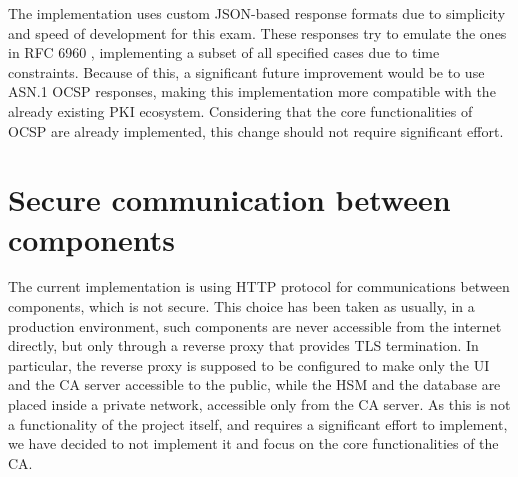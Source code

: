 The implementation uses custom JSON-based response formats due to simplicity and speed of development 
for this exam. These responses try to emulate the ones in RFC 6960 \cite{rfc6960}, implementing a subset of all
specified cases due to time constraints.
Because of this, a significant future improvement would be to use ASN.1 OCSP responses, making this 
implementation more compatible with the already existing PKI ecosystem. Considering that the core 
functionalities of OCSP are already implemented, this change should not require significant effort.

\section{Secure communication between components}
The current implementation is using HTTP protocol for communications between components, which is not 
secure. This choice has been taken as usually, in a production environment, such components are 
never accessible from the internet directly, but only through a reverse proxy that
provides TLS termination. In particular, the reverse proxy is supposed to be configured to make
only the UI and the CA server accessible to the public, while the HSM and the database are 
placed inside a private network, accessible only from the CA server. As this is not a functionality
of the project itself, and requires a significant effort to implement, we have decided to not implement 
it and focus on the core functionalities of the CA.